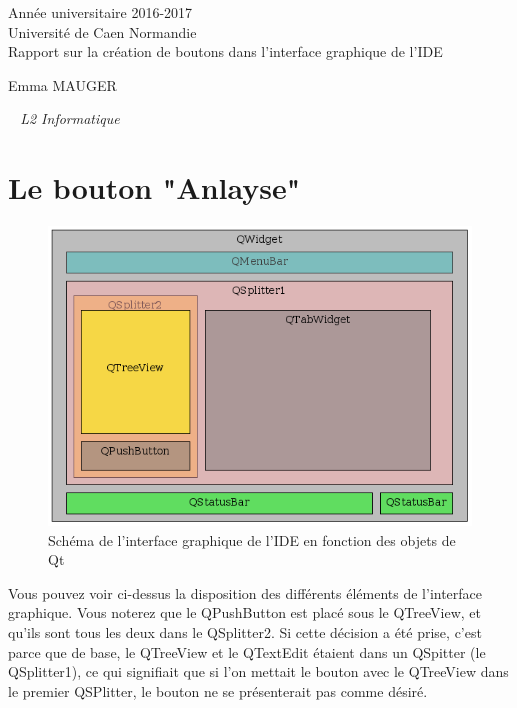 \documentclass[a4paper,12pt]{article}
\begin{document}
\begin{titlepage}
	\begin{center}
		\Large{Année universitaire 2016-2017}\\
		\Large{Université de Caen Normandie}\\[1cm]
		
		\huge{Rapport sur la création de boutons dans l'interface graphique de l'IDE}\\
		\vspace{3cm}
		
		Emma MAUGER
		
	\normalsize{\textit{ ~ L2 Informatique}}\\
		\medskip
		\vspace{2cm}
				
	\end{center}
\end{titlepage}

\tableofcontents
\newpage

\section{Le bouton "Anlayse"}

\begin{figure}
	\begin{center}
		\includegraphics[scale=0.5]{images/ide_graphique.png}
	\end{center}
	\caption{Schéma de l'interface graphique de l'IDE en fonction des objets de Qt}
\end{figure}

Vous pouvez voir ci-dessus la disposition des différents éléments de l'interface graphique. Vous noterez que le QPushButton est placé sous le QTreeView, et qu'ils sont tous les deux dans le QSplitter2. Si cette décision a été prise, c'est parce que de base, le QTreeView et le QTextEdit étaient dans un QSpitter (le QSplitter1), ce qui signifiait que si l'on mettait le bouton avec le QTreeView dans le premier QSPlitter, le bouton ne se présenterait pas comme désiré.\\
\end{document}
